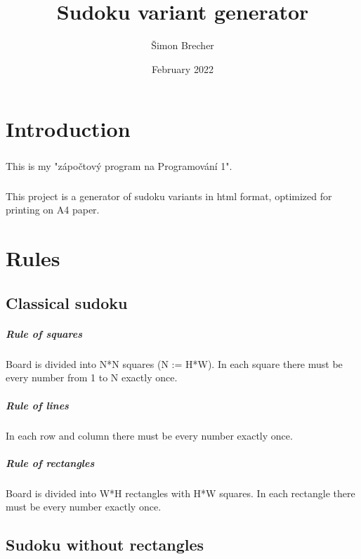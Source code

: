 \documentclass{report}
\title{Sudoku variant generator}
\author{Šimon Brecher}
\date{February 2022}
\begin{document}
\maketitle

\chapter{Introduction}

\paragraph{}
This is my "zápočtový program na Programování 1".

\paragraph{}
This project is a generator of sudoku variants in html format, optimized for printing on A4 paper.

\chapter{Rules}

\section{Classical sudoku}

\paragraph{Rule of squares}
Board is divided into N*N squares (N := H*W). In each square there must be every number from 1 to N exactly once.

\paragraph{Rule of lines}
In each row and column there must be every number exactly once.

\paragraph{Rule of rectangles}
Board is divided into W*H rectangles with H*W squares. In each rectangle there must be every number exactly once.

\section{Sudoku without rectangles}
\end{document}

